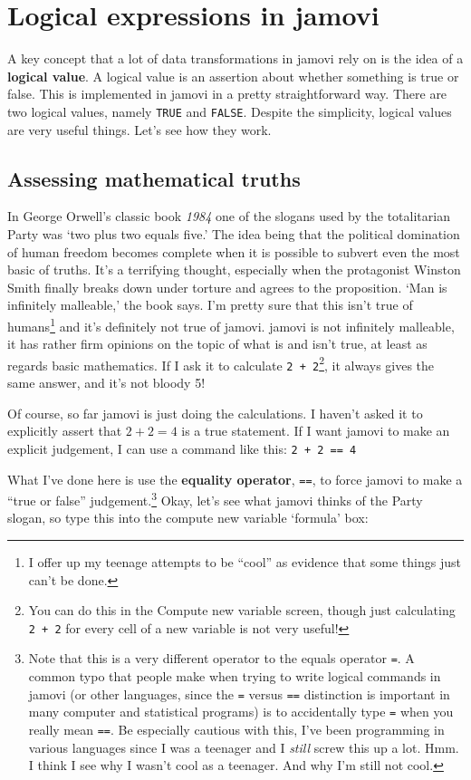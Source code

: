 \documentclass[
]{book}
\begin{document}
\hypertarget{logicals}{%
\section{Logical expressions in jamovi}\label{logicals}}

A key concept that a lot of data transformations in jamovi rely on is the idea of a {\textbf{logical value}}. A logical value is an assertion about whether something is true or false. This is implemented in jamovi in a pretty straightforward way. There are two logical values, namely \texttt{TRUE} and \texttt{FALSE}. Despite the simplicity, logical values are very useful things. Let's see how they work.

\hypertarget{assessing-mathematical-truths}{%
\subsection{Assessing mathematical truths}\label{assessing-mathematical-truths}}

In George Orwell's classic book \emph{1984} one of the slogans used by the totalitarian Party was `two plus two equals five.' The idea being that the political domination of human freedom becomes complete when it is possible to subvert even the most basic of truths. It's a terrifying thought, especially when the protagonist Winston Smith finally breaks down under torture and agrees to the proposition. `Man is infinitely malleable,' the book says. I'm pretty sure that this isn't true of humans\footnote{I offer up my teenage attempts to be ``cool'' as evidence that some things just can't be done.} and it's definitely not true of jamovi. jamovi is not infinitely malleable, it has rather firm opinions on the topic of what is and isn't true, at least as regards basic mathematics. If I ask it to calculate \texttt{2\ +\ 2}\footnote{You can do this in the Compute new variable screen, though just calculating \texttt{2\ +\ 2} for every cell of a new variable is not very useful!}, it always gives the same answer, and it's not bloody 5!

Of course, so far jamovi is just doing the calculations. I haven't asked it to explicitly assert that \(2+2 = 4\) is a true statement. If I want jamovi to make an explicit judgement, I can use a command like this: \texttt{2\ +\ 2\ ==\ 4}

What I've done here is use the {\textbf{equality operator}}, \texttt{==}, to force jamovi to make a ``true or false'' judgement.\footnote{Note that this is a very different operator to the equals operator \texttt{=}. A common typo that people make when trying to write logical commands in jamovi (or other languages, since the \texttt{=} versus \texttt{==} distinction is important in many computer and statistical programs) is to accidentally type \texttt{=} when you really mean \texttt{==}. Be especially cautious with this, I've been programming in various languages since I was a teenager and I \emph{still} screw this up a lot. Hmm. I think I see why I wasn't cool as a teenager. And why I'm still not cool.} Okay, let's see what jamovi thinks of the Party slogan, so type this into the compute new variable `formula' box:
\end{document}
